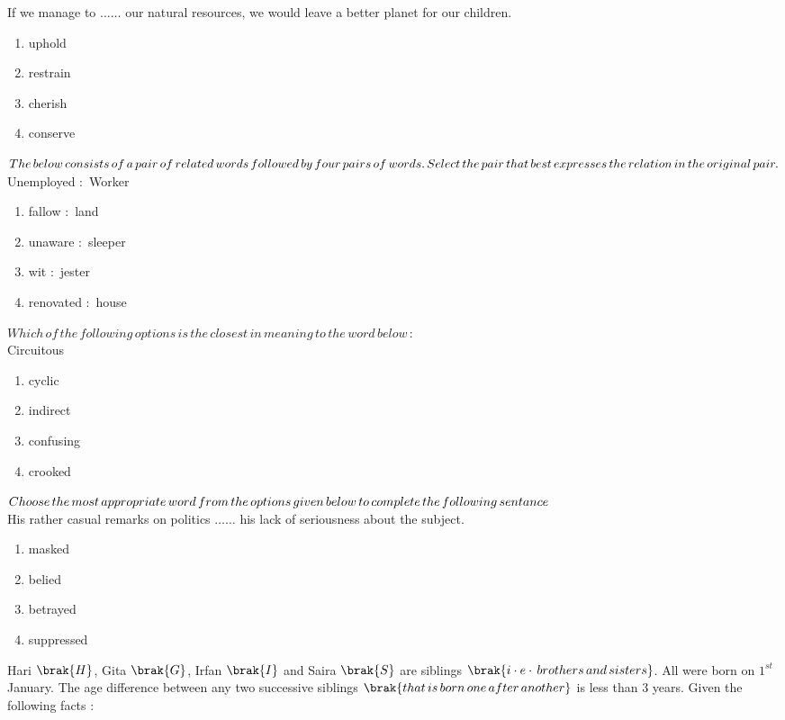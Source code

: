     If we manage to $\dots\dots$ our natural resources, we would leave a better planet for our children.
    \begin{enumerate}
        \item uphold
        \item restrain
        \item cherish
        \item conserve
    \end{enumerate}
    \item $The\,below\,consists\,of\,a\,pair\,of\,related\,words\,followed\,by\,four\,pairs\,of\,words.\,Select\,the\\\,pair\,that\,best\,expresses\,the\,relation\,in\,the\,original\,pair.$\\
    Unemployed $\colon$ Worker
    \begin{enumerate}
        \item fallow $\colon$ land
        \item unaware $\colon$ sleeper
        \item wit $\colon$ jester
        \item renovated $\colon$ house
    \end{enumerate}
    \item $Which\,of\,the\,following\,options\,is\,the\,closest\,in\,meaning\,to\,the\,word\,below\,\colon$\\
    Circuitous
    \begin{enumerate}
        \item cyclic
        \item indirect
        \item confusing
        \item crooked
    \end{enumerate}
    \item $Choose\,the\,most\,appropriate\,word\,from\,the\,options\,given\,below\,to\,complete\,the\,following\\\,sentance$\\
    His rather casual remarks on politics $\dots\dots$ his lack of seriousness about the subject.
    \begin{enumerate}
        \item masked
        \item belied
        \item betrayed
        \item suppressed
    \end{enumerate}
    \item Hari $\brak{H}$, Gita $\brak{G}$, Irfan $\brak{I}$ and Saira $\brak{S}$ are siblings $\brak{i\cdot e\cdot\, brothers\, and\, sisters}$. All were born on $1^{st}$ January. The age difference between any two successive siblings $\brak{that\, is\, born\, one\, after\, another}$ is less than $3$ years. Given the following facts $\colon$
